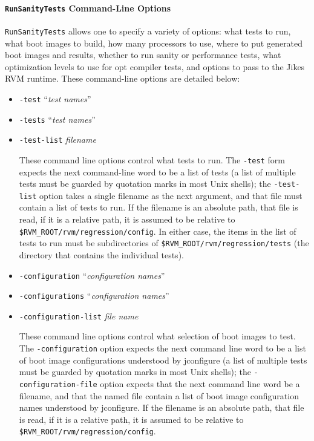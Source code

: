 \paragraph{{\tt{RunSanityTests}} Command-Line Options}

 {\tt{RunSanityTests}} allows one to specify a variety of options:
what tests to run, what boot images to build, how many processors to
use, where to put generated boot images and results, whether to run
sanity or performance tests, what optimization levels to use for opt
compiler tests, and options to pass to the Jikes RVM runtime.  These
command-line options are detailed below:

\begin{itemize}
\item{\tt{-test}} ``{\em{test names}}''
\item{\tt{-tests}} ``{\em{test names}}''
\item{\tt{-test-list}} {\em{filename}}

 These command line options control what tests to run.  The
{\tt{-test}} form expects the next command-line word to be a list
of tests (a list of multiple tests must be guarded by quotation marks
in most Unix shells); the {\tt{-test-list}} option takes a single
filename as the next argument, and that file must contain a list of
tests to run.  If the filename is an absolute path, that file is read,
if it is a relative path, it is assumed to be relative to
{\tt \$RVM\_ROOT/rvm/regression/config}.  In either case, the items in the
list of tests to run must be subdirectories of
{\tt \$RVM\_ROOT/rvm/regression/tests} (the directory that contains the
individual tests).

\item{\tt{-configuration}} ``{\em{configuration names}}''
\item{\tt{-configurations}} ``{\em{configuration names}}''
\item{\tt{-configuration-list}} {\em{file name}}

 These command line options control what selection of boot images to
test.  The {\tt{-configuration}} option expects the next command
line word to be a list of boot image configurations understood by
jconfigure (a list of multiple tests must be guarded by quotation
marks in most Unix shells); the {\tt{-configuration-file}} option
expects that the next command line word be a filename, and that the
named file contain a list of boot image configuration names understood
by jconfigure.  If the filename is an absolute path, that file is
read, if it is a relative path, it is assumed to be relative to
{\tt \$RVM\_ROOT/rvm/regression/config}.


\end{itemize}
